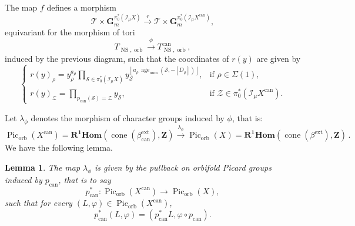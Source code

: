 \documentclass{proc-l}
\newcommand{\Z}{\mathbf{Z}}
\newcommand{\I}{\mathcal{I}}
\newcommand{\G}{\mathbf{G}}
\DeclareMathOperator{\Pic}{Pic}
\DeclareMathOperator{\can}{can}
\DeclareMathOperator{\coneform}{cone}
\DeclareMathOperator{\num}{num}
\DeclareMathOperator{\age}{age}
\DeclareMathOperator{\NS}{NS}
\DeclareMathOperator{\orb}{orb}
\DeclareMathOperator{\ext}{ext}
\newcommand{\stackZ}{\mathcal{Z}}
\newcommand{\stackS}{\mathcal{S}}
\newcommand{\stackT}{\mathcal{T}}
\newcommand{\sheafI}{\mathcal{I}}
\newcommand{\twistsector}{\pi_0^*(\sheafI_{\mu} X)}
\newtheorem{lemma}[theorem]{Lemma}
\theoremstyle{definition}
\theoremstyle{remark}
\numberwithin{equation}{section}
\begin{document}
The map $f$ defines a morphism
\[
\stackT \times \G_m^{\twistsector}
\xrightarrow{r}
\stackT \times \G_m^{\pi_0^*(\I_{\mu} X^{\can})},
\]equivariant for the morphism of tori
\[
T_{\NS,\orb} \xrightarrow{\phi} T^{\can}_{\NS,\orb},
\]induced by the previous diagram, such that the coordinates of $r(y)$ are given by
\begin{equation}\label{equation_description_r}
\begin{cases}
\displaystyle
r(y)_{\rho}
=
y_{\rho}^{a_{\rho}}
\prod_{\stackS \in \twistsector}
y_{\stackS}^{\left\lfloor
a_{\rho}\,\age_{\num}\!\left(\stackS,-[D_{\rho}]\right)
\right\rfloor},
& \text{if } \rho \in \Sigma(1), \\[1.6em]

\displaystyle
r(y)_{\stackZ}
=
\prod_{p_{\can}(\stackS)=\stackZ}
y_{\stackS},
& \text{if } \stackZ \in \pi_0^*(\I_{\mu} X^{\can}).
\end{cases}
\end{equation}

Let $\lambda_{\phi}$ denotes the morphism of character groups induced by $\phi$, that is: \[
\Pic_{\orb}(X^{\can}) = \mathbf{R^1Hom}(\coneform(\beta^{\ext}_{\can}) ,\Z)
\xrightarrow{\lambda_{\phi}}
\Pic_{\orb}(X) = \mathbf{R^1Hom}(\coneform(\beta^{\ext}) ,\Z) \, .
\]We have the following lemma.

\begin{lemma}
The map $\lambda_{\phi}$ is given by the pullback on orbifold Picard groups induced by $p_{\can}$, that is to say
$$
p_{\can}^* : \Pic_{\orb}(X^{\can}) \longrightarrow \Pic_{\orb}(X),
$$
such that for every $(L,\varphi) \in \Pic_{\orb}(X^{\can})$,
$$
p_{\can}^*(L,\varphi) = \left(p_{\can}^*L,\varphi \circ p_{\can}\right).
$$
\end{lemma}
\end{document}
